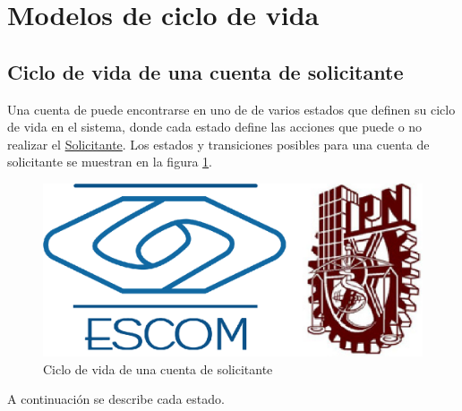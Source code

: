 
\section{Modelos de ciclo de vida}

	\hypertarget{CV:CuentaSolicitante}{}
	\subsection{Ciclo de vida de una cuenta de solicitante}

		Una cuenta de puede encontrarse en uno de de varios estados que definen su ciclo de vida en el sistema, donde cada estado define las acciones que puede o no realizar el \hyperlink{A:Solicitante}{Solicitante}. Los estados y transiciones posibles para una cuenta de solicitante se muestran en la figura \ref{fig:CV:CuentaSolcitante}.

		\begin{figure}[h]
			
			\begin{center}				
				
				\includegraphics[scale=0.35]{imagenes/CiclosDeVida/cv-CuentaSolicitante.jpg}
				\caption{Ciclo de vida de una cuenta de solicitante}
				\label{fig:CV:CuentaSolcitante}
				
			\end{center}
			
		\end{figure}
	
		A continuación se describe cada estado.


